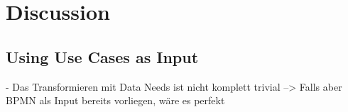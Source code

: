 \chapter{Discussion}
\label{ch:Discussion}

\section{Using Use Cases as Input}
- Das Transformieren mit Data Needs ist nicht komplett trivial --> Falls aber BPMN als Input bereits vorliegen, wäre es perfekt
